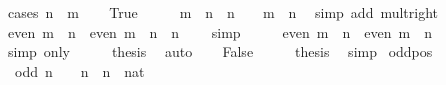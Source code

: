 \begin{isabellebody}
%
\isadelimproof
%
\endisadelimproof
%
\isatagproof
{}\isamarkupfalse%
\ {\isacharparenleft}{\kern0pt}cases\ {\isachardoublequoteopen}n\ {\isasymle}\ m{\isachardoublequoteclose}{\isacharparenright}{\kern0pt}\isanewline
\ \ \isamarkupfalse%
\ True\isanewline
\ \ \isamarkupfalse%
\ \isamarkupfalse%
\ {\isachardoublequoteopen}m\ {\isacharminus}{\kern0pt}\ n\ {\isacharplus}{\kern0pt}\ n\ {\isacharasterisk}{\kern0pt}\ {}\ {\isacharequal}{\kern0pt}\ m\ {\isacharplus}{\kern0pt}\ n{\isachardoublequoteclose}\ \isamarkupfalse%
\ {\isacharparenleft}{\kern0pt}simp\ add{\isacharcolon}{\kern0pt}\ mult{\isacharunderscore}{\kern0pt}{}{\isacharunderscore}{\kern0pt}right{\isacharparenright}{\kern0pt}\isanewline
\ \ \isamarkupfalse%
\ \isamarkupfalse%
\ {\isachardoublequoteopen}even\ {\isacharparenleft}{\kern0pt}m\ {\isacharminus}{\kern0pt}\ n{\isacharparenright}{\kern0pt}\ {\isasymlongleftrightarrow}\ even\ {\isacharparenleft}{\kern0pt}m\ {\isacharminus}{\kern0pt}\ n\ {\isacharplus}{\kern0pt}\ n\ {\isacharasterisk}{\kern0pt}\ {}{\isacharparenright}{\kern0pt}{\isachardoublequoteclose}\ \isamarkupfalse%
\ simp\isanewline
\ \ \isamarkupfalse%
\ \isamarkupfalse%
\ {\isachardoublequoteopen}even\ {\isacharparenleft}{\kern0pt}m\ {\isacharminus}{\kern0pt}\ n{\isacharparenright}{\kern0pt}\ {\isasymlongleftrightarrow}\ even\ {\isacharparenleft}{\kern0pt}m\ {\isacharplus}{\kern0pt}\ n{\isacharparenright}{\kern0pt}{\isachardoublequoteclose}\ \isamarkupfalse%
\ {\isacharparenleft}{\kern0pt}simp\ only{\isacharcolon}{\kern0pt}{\isacharparenright}{\kern0pt}\isanewline
\ \ \isamarkupfalse%
\ \isamarkupfalse%
\ {\isacharquery}{\kern0pt}thesis\ \isamarkupfalse%
\ auto\isanewline
{}\isamarkupfalse%
\isanewline
\ \ \isamarkupfalse%
\ False\isanewline
\ \ \isamarkupfalse%
\ \isamarkupfalse%
\ {\isacharquery}{\kern0pt}thesis\ \isamarkupfalse%
\ simp\isanewline
{}\isamarkupfalse%
%
\endisatagproof
{\isafoldproof}%
%
\isadelimproof
\isanewline
%
\endisadelimproof
\isanewline
{}\isamarkupfalse%
\ odd{\isacharunderscore}{\kern0pt}pos{\isacharcolon}{\kern0pt}\isanewline
\ \ {\isachardoublequoteopen}odd\ n\ {\isasymLongrightarrow}\ {}\ {\isacharless}{\kern0pt}\ n{\isachardoublequoteclose}\ \ n\ {\isacharcolon}{\kern0pt}{\isacharcolon}{\kern0pt}\ nat\isanewline

\end{isabellebody}
